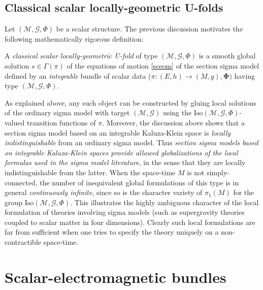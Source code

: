 \documentclass[10pt, cmp, numbook, final, a4paper]{svjour}
\newcommand*{\SavedEqref}{}
\let\SavedEqref\eqref
\renewcommand*{\eqref}[1]{%
  \begingroup
    \hypersetup{
      linkcolor=blue,
      linkbordercolor=blue,
    }%
    \SavedEqref{#1}%
  \endgroup
}
\newcommand{\cM}{\mathcal{M}}
\def\cG{\mathcal{G}}
\def\bPhi{\mathbf{\Phi}}
\def\Iso{\mathrm{Iso}}
\begin{document}
\subsection{Classical scalar locally-geometric U-folds}

Let $(\cM,\cG,\Phi)$ be a scalar structure. The previous discussion
motivates the following mathematically rigorous definition:
	
\begin{definition}
A {\em classical scalar locally-geometric U-fold} of type
$(\cM,\cG,\Phi)$ is a smooth global solution $s\in \Gamma(\pi)$ of the
equations of motion \eqref{sceom} of the section sigma model defined
by an {\em integrable} bundle of scalar data ($\pi:(E,h)\rightarrow
(M,g),\bPhi)$ having type $(\cM,\cG,\Phi)$.
\end{definition}

\noindent
As explained above, any such object can be constructed by gluing local
solutions of the ordinary sigma model with target $(\cM,\cG)$ using
the $\Iso(\cM,\cG,\Phi)$-valued transition functions of
$\pi$. Moreover, the discussion above shows that a section sigma model
based on an integrable Kaluza-Klein space is {\em locally
indistinguishable} from an ordinary sigma model. Thus {\em section
sigma models based on integrable Kaluza-Klein spaces provide allowed
globalizations of the local formulas used in the sigma model
literature}, in the sense that they are locally indistinguishable from
the latter. When the space-time $M$ is not simply-connected, the
number of inequivalent global formulations of this type is in general
{\em continuously infinite}, since so is the character variety of
$\pi_1(M)$ for the group $\Iso(\cM,\cG,\Phi)$. This illustrates the
highly ambiguous character of the local formulation of theories
involving sigma models (such as supergravity theories coupled to
scalar matter in four dimensions). Clearly such local formulations are
far from sufficient when one tries to specify the theory uniquely on a
non-contractible space-time.
	
\section{Scalar-electromagnetic bundles}
\label{sec:scalarelectro}
	
\end{document}
